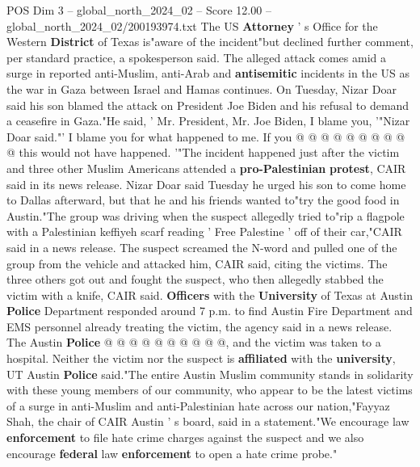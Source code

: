 \begin{textsample}{POS Dim 3 – global\_north\_2024\_02 – Score 12.00 – global\_north\_2024\_02/200193974.txt}
The US \textbf{Attorney} ' s Office for the Western \textbf{District} of Texas is"aware of the incident"but declined further comment, per standard practice, a spokesperson said.
The alleged attack comes amid a surge in reported anti-Muslim, anti-Arab and \textbf{antisemitic} incidents in the US as the war in Gaza between Israel and Hamas continues.
On Tuesday, Nizar Doar said his son blamed the attack on President Joe Biden and his refusal to demand a ceasefire in Gaza."He said, ' Mr.
President, Mr.
Joe Biden, I blame you, '"Nizar Doar said."' I blame you for what happened to me.
If you @ @ @ @ @ @ @ @ @ @ this would not have happened. '"The incident happened just after the victim and three other Muslim Americans attended a \textbf{pro-Palestinian} \textbf{protest}, CAIR said in its news release.
Nizar Doar said Tuesday he urged his son to come home to Dallas afterward, but that he and his friends wanted to"try the good food in Austin."The group was driving when the suspect allegedly tried to"rip a flagpole with a Palestinian keffiyeh scarf reading ' Free Palestine ' off of their car,"CAIR said in a news release.
The suspect screamed the N-word and pulled one of the group from the vehicle and attacked him, CAIR said, citing the victims.
The three others got out and fought the suspect, who then allegedly stabbed the victim with a knife, CAIR said. \textbf{Officers} with the \textbf{University} of Texas at Austin \textbf{Police} Department responded around 7 p.m. to find Austin Fire Department and EMS personnel already treating the victim, the agency said in a news release.
The Austin \textbf{Police} @ @ @ @ @ @ @ @ @ @, and the victim was taken to a hospital.
Neither the victim nor the suspect is \textbf{affiliated} with the \textbf{university}, UT Austin \textbf{Police} said."The entire Austin Muslim community stands in solidarity with these young members of our community, who appear to be the latest victims of a surge in anti-Muslim and anti-Palestinian hate across our nation,"Fayyaz Shah, the chair of CAIR Austin ' s board, said in a statement."We encourage law \textbf{enforcement} to file hate crime charges against the suspect and we also encourage \textbf{federal} law \textbf{enforcement} to open a hate crime probe."

\end{textsample}
